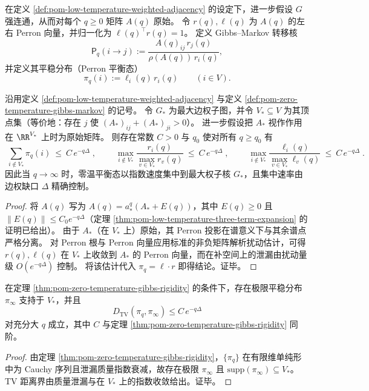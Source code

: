 \begin{definition}\label{def:pom-zero-temperature-gibbs-markov}
在定义 \ref{def:pom-low-temperature-weighted-adjacency} 的设定下，进一步假设 \(G\) 强连通，从而对每个 \(q\ge0\) 矩阵 \(A(q)\) 原始。
令 \(r(q),\ell(q)\) 为 \(A(q)\) 的左右 Perron 向量，并归一化为 \(\ell(q)^\top r(q)=1\)。
定义 Gibbs--Markov 转移核
\[
\mathsf{P}_q(i\to j):=\frac{A(q)_{ij}\,r_j(q)}{\rho(A(q))\,r_i(q)},
\]
并定义其平稳分布（Perron 平衡态）
\[
\pi_q(i):=\ell_i(q)\,r_i(q)\qquad(i\in V).
\]
\end{definition}

\begin{theorem}\label{thm:pom-zero-temperature-gibbs-rigidity}
沿用定义 \ref{def:pom-low-temperature-weighted-adjacency} 与定义 \ref{def:pom-zero-temperature-gibbs-markov} 的记号。
令 \(G_*\) 为最大边权子图，并令 \(V_*\subseteq V\) 为其顶点集（等价地：存在 \(j\) 使 \((A_*)_{ij}+(A_*)_{ji}>0\)）。
进一步假设把 \(A_*\) 视作作用在 \(\RR^{V_*}\) 上时为原始矩阵。
则存在常数 \(C>0\) 与 \(q_0\) 使对所有 \(q\ge q_0\) 有
\[
\boxed{\;
\sum_{i\notin V_*}\pi_q(i)\ \le\ C\,e^{-q\Delta}\; },
\qquad
\boxed{\;
\max_{i\notin V_*}\frac{r_i(q)}{\max_{v\in V_*}r_v(q)}\ \le\ C\,e^{-q\Delta}\; },
\qquad
\boxed{\;
\max_{i\notin V_*}\frac{\ell_i(q)}{\max_{v\in V_*}\ell_v(q)}\ \le\ C\,e^{-q\Delta}\; }.
\]
因此当 \(q\to\infty\) 时，零温平衡态以指数速度集中到最大权子核 \(G_*\)，且集中速率由边权缺口 \(\Delta\) 精确控制。
\end{theorem}
\begin{proof}
将 \(A(q)\) 写为 \(A(q)=a_*^q(A_*+E(q))\)，其中 \(E(q)\ge0\) 且 \(\|E(q)\|\le C_0e^{-q\Delta}\)（定理 \ref{thm:pom-low-temperature-three-term-expansion} 的证明已给出）。
由于 \(A_*\)（在 \(V_*\) 上）原始，其 Perron 投影在谱意义下与其余谱点严格分离。
对 Perron 根与 Perron 向量应用标准的非负矩阵解析扰动估计，可得 \(r(q),\ell(q)\) 在 \(V_*\) 上收敛到 \(A_*\) 的 Perron 向量，而在补空间上的泄漏由扰动量级 \(O(e^{-q\Delta})\) 控制。
将该估计代入 \(\pi_q=\ell\cdot r\) 即得结论。证毕。
\end{proof}

\begin{corollary}\label{cor:pom-zero-temperature-gibbs-limit}
在定理 \ref{thm:pom-zero-temperature-gibbs-rigidity} 的条件下，存在极限平稳分布 \(\pi_\infty\) 支持于 \(V_*\)，并且
\[
D_{\mathrm{TV}}(\pi_q,\pi_\infty)\le C\,e^{-q\Delta}
\]
对充分大 \(q\) 成立，其中 \(C\) 与定理 \ref{thm:pom-zero-temperature-gibbs-rigidity} 同阶。
\end{corollary}
\begin{proof}
由定理 \ref{thm:pom-zero-temperature-gibbs-rigidity}，\(\{\pi_q\}\) 在有限维单纯形中为 Cauchy 序列且泄漏质量指数衰减，故存在极限 \(\pi_\infty\) 且 \(\mathrm{supp}(\pi_\infty)\subseteq V_*\)。
TV 距离界由质量泄漏与在 \(V_*\) 上的指数收敛给出。证毕。
\end{proof}


